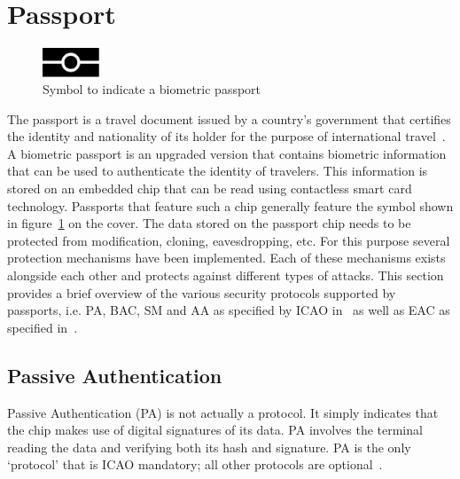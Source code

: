 \section{Passport}
\label{subsec:passports}
\begin{figure}
  \centering
	\includegraphics[width=0.15\textwidth]{images/biometrics_logo.pdf}
	\caption{Symbol to indicate a biometric passport}
	\label{fig:biometricslogo}
\end{figure}
The passport is a travel document issued by a country's government that certifies the identity and nationality of its holder for the purpose of international travel~\cite{passportdefinition}. A biometric passport is an upgraded version that contains biometric information that can be used to authenticate the identity of travelers. This information is stored on an embedded chip that can be read using contactless smart card technology. Passports that feature such a chip generally feature the symbol shown in figure~\ref{fig:biometricslogo} on the cover. The data stored on the passport chip needs to be protected from modification, cloning, eavesdropping, etc. For this purpose several protection mechanisms have been implemented. Each of these mechanisms exists alongside each other and protects against different types of attacks. This section provides a brief overview of the various security protocols supported by passports, i.e. PA, BAC, SM and AA as specified by ICAO in~\cite{icao} as well as EAC as specified in~\cite{bsi}. 

\subsection{Passive Authentication}
\label{subsubsec:pa}
Passive Authentication (PA) is not actually a protocol. It simply indicates that the chip makes use of digital signatures of its data. PA involves the terminal reading the data and verifying both its hash and signature. PA is the only `protocol' that is ICAO mandatory; all other protocols are optional~\cite{mostowski2010electronic}.

